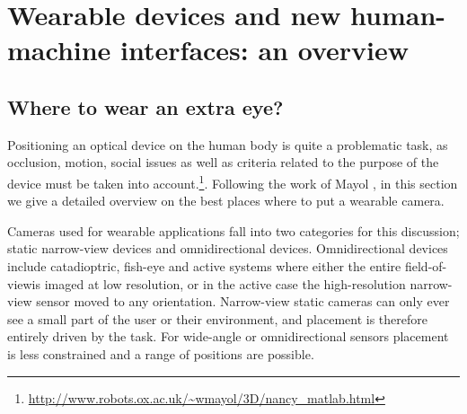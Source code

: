 
\chapter{Wearable devices and new human-machine interfaces: an overview}



\section{Where to wear an extra eye?}
Positioning an optical device on the human body is quite a problematic task, as occlusion, motion, social issues as well as criteria related to the purpose of the device must be taken into account.\footnote{\url{http://www.robots.ox.ac.uk/~wmayol/3D/nancy_matlab.html}}. Following the work of Mayol \etal \cite{mayol2001positioning}, in this section we give a detailed overview on the best places where to put a wearable camera.

Cameras used for wearable applications fall into two categories for this discussion; static narrow-view devices and omnidirectional devices. Omnidirectional devices include catadioptric, fish-eye and active systems where either the entire field-of-viewis imaged at low resolution, or in the active case the high-resolution narrow-view sensor moved to any orientation. Narrow-view static cameras can only ever see a small part of the user or their environment, and placement is therefore entirely driven by the task. For wide-angle or omnidirectional sensors placement is less constrained and a range of positions are possible. 

